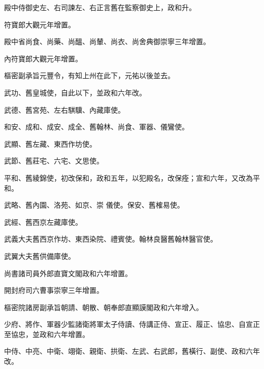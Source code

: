 \begin{pinyinscope}
 殿中侍御史左、右司諫左、右正言舊在監察御史上，政和升。



 符寶郎大觀元年增置。



 殿中省尚食、尚藥、尚醞、尚輦、尚衣、尚舍典御崇寧三年增置。



 內符寶郎大觀元年增置。



 樞密副承旨元豐令，有知上州在此下，元祐以後並去。



 武功、舊皇城使，自此以下，並政和六年改。



 武德、舊宮苑、左右騏驥、內藏庫使。



 和安、成和、成安、成全、舊翰林、尚食、軍器、儀鸞使。



 武顯、舊左藏、東西作坊使。



 武節、舊莊宅、六宅、文思使。



 平和、舊綾錦使，初改保和，政和五年，以犯殿名，改保痊；宣和六年，又改為平和。



 武略、舊內園、洛苑、如京、崇
 儀使。保安、舊榷易使。



 武經、舊西京左藏庫使。



 武義大夫舊西京作坊、東西染院、禮賓使。翰林良醫舊翰林醫官使。



 武翼大夫舊供備庫使。



 尚書諸司員外郎直寶文閣政和六年增置。



 開封府司六曹事崇寧三年增置。



 樞密院諸房副承旨朝請、朝散、朝奉郎直顯謨閣政和六年增入。



 少府、將作、軍器少監諸衛將軍太子侍讀、侍講正侍、宣正、履正、協忠、自宣正至協忠，並政和六年增置。



 中侍、中亮、中衛、翊衛、親衛、拱衛、左武、右武郎，舊橫行、副使、政和六年改。




\end{pinyinscope}
